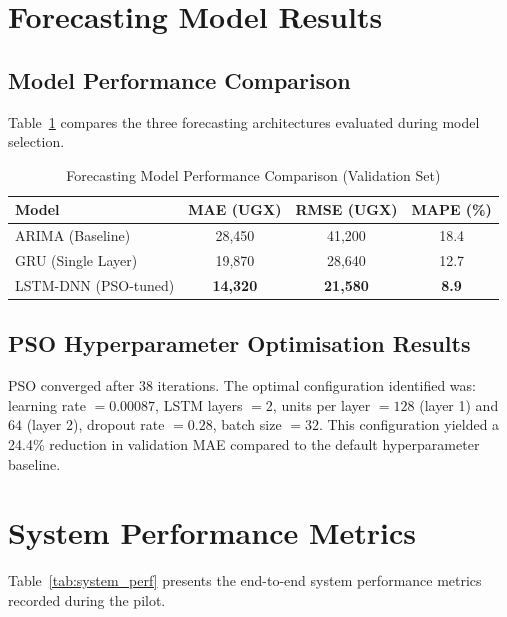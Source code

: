 \documentclass[12pt,a4paper]{report}
\begin{document}
\section{Forecasting Model Results}

\subsection{Model Performance Comparison}

Table~\ref{tab:forecast_comparison} compares the three forecasting architectures
evaluated during model selection.

\begin{table}[H]
\centering
\caption{Forecasting Model Performance Comparison (Validation Set)}
\label{tab:forecast_comparison}
\begin{tabular}{lccc}
\toprule
\textbf{Model} & \textbf{MAE (UGX)} & \textbf{RMSE (UGX)} & \textbf{MAPE (\%)} \\
\midrule
ARIMA (Baseline)         & 28,450 & 41,200 & 18.4 \\
GRU (Single Layer)       & 19,870 & 28,640 & 12.7 \\
LSTM-DNN (PSO-tuned)     & \textbf{14,320} & \textbf{21,580} & \textbf{8.9} \\
\bottomrule
\end{tabular}
\end{table}

\subsection{PSO Hyperparameter Optimisation Results}

PSO converged after 38 iterations. The optimal configuration identified was: learning
rate $= 0.00087$, LSTM layers $= 2$, units per layer $= 128$ (layer 1) and $64$
(layer 2), dropout rate $= 0.28$, batch size $= 32$. This configuration yielded a
24.4\% reduction in validation MAE compared to the default hyperparameter baseline.

\section{System Performance Metrics}

Table~\ref{tab:system_perf} presents the end-to-end system performance metrics
recorded during the pilot.
\end{document}
